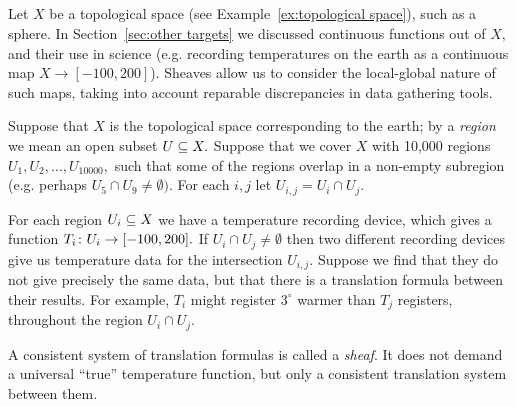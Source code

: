 \documentclass[../main/CT4S-EN-RU]{subfiles}
\begin{document}
\begin{applicationRUS}
\end{applicationRUS}


\subsection{}\label{sec:sheaves}

\begin{blockENG}
Let $X$ be a topological space (see Example~\ref{ex:topological space}), such as a sphere. In Section~\ref{sec:other targets} we discussed continuous functions out of $X,$ and their use in science (e.g. recording temperatures on the earth as a continuous map $X\to[-100,200]$). Sheaves allow us to consider the local-global nature of such maps, taking into account reparable discrepancies in data gathering tools. 
\end{blockENG}

\begin{blockRUS}
\end{blockRUS}

\begin{applicationENG}\label{app:sheaves of temperature}
Suppose that $X$ is the topological space corresponding to the earth; by a {\em region} we mean an open subset $U\ss X.$ Suppose that we cover $X$ with 10,000 regions $U_1,U_2,\ldots,U_{10000},$ such that some of the regions overlap in a non-empty subregion (e.g. perhaps $U_5\cap U_9\neq\emptyset).$ For each $i,j$ let $U_{i,j}=U_i\cap U_j.$ 

For each region $U_i\ss X$ we have a temperature recording device, which gives a function $T_i\taking U_i\to[-100,200].$ If $U_i\cap U_j\neq\emptyset$ then two different recording devices give us temperature data for the intersection $U_{i,j}.$ Suppose we find that they do not give precisely the same data, but that there is a translation formula between their results. For example, $T_i$ might register $3^\circ$ warmer than $T_j$ registers, throughout the region $U_i\cap U_j.$

A consistent system of translation formulas is called a {\em sheaf}. It does not demand a universal “true” temperature function, but only a consistent translation system between them. 
\end{applicationENG}

\begin{applicationRUS}\label{app:sheaves of temperature}
\end{applicationRUS}
\end{document}
